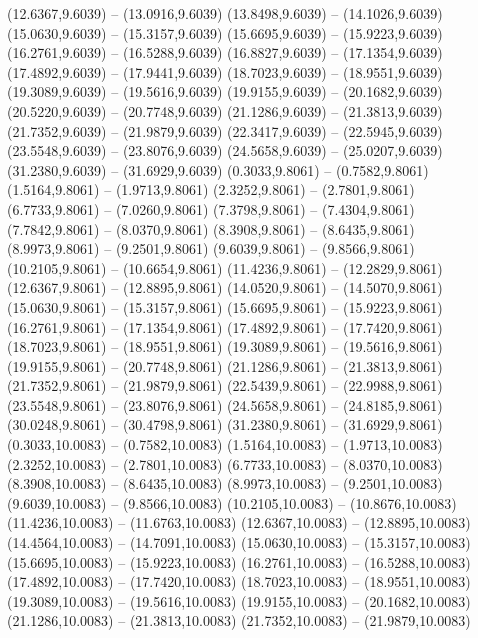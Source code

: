 {\begin{scope}[shift={(#1,#2)}]
    (12.6367,9.6039) -- (13.0916,9.6039)
    (13.8498,9.6039) -- (14.1026,9.6039)
    (15.0630,9.6039) -- (15.3157,9.6039)
    (15.6695,9.6039) -- (15.9223,9.6039)
    (16.2761,9.6039) -- (16.5288,9.6039)
    (16.8827,9.6039) -- (17.1354,9.6039)
    (17.4892,9.6039) -- (17.9441,9.6039)
    (18.7023,9.6039) -- (18.9551,9.6039)
    (19.3089,9.6039) -- (19.5616,9.6039)
    (19.9155,9.6039) -- (20.1682,9.6039)
    (20.5220,9.6039) -- (20.7748,9.6039)
    (21.1286,9.6039) -- (21.3813,9.6039)
    (21.7352,9.6039) -- (21.9879,9.6039)
    (22.3417,9.6039) -- (22.5945,9.6039)
    (23.5548,9.6039) -- (23.8076,9.6039)
    (24.5658,9.6039) -- (25.0207,9.6039)
    (31.2380,9.6039) -- (31.6929,9.6039)
    (0.3033,9.8061) -- (0.7582,9.8061)
    (1.5164,9.8061) -- (1.9713,9.8061)
    (2.3252,9.8061) -- (2.7801,9.8061)
    (6.7733,9.8061) -- (7.0260,9.8061)
    (7.3798,9.8061) -- (7.4304,9.8061)
    (7.7842,9.8061) -- (8.0370,9.8061)
    (8.3908,9.8061) -- (8.6435,9.8061)
    (8.9973,9.8061) -- (9.2501,9.8061)
    (9.6039,9.8061) -- (9.8566,9.8061)
    (10.2105,9.8061) -- (10.6654,9.8061)
    (11.4236,9.8061) -- (12.2829,9.8061)
    (12.6367,9.8061) -- (12.8895,9.8061)
    (14.0520,9.8061) -- (14.5070,9.8061)
    (15.0630,9.8061) -- (15.3157,9.8061)
    (15.6695,9.8061) -- (15.9223,9.8061)
    (16.2761,9.8061) -- (17.1354,9.8061)
    (17.4892,9.8061) -- (17.7420,9.8061)
    (18.7023,9.8061) -- (18.9551,9.8061)
    (19.3089,9.8061) -- (19.5616,9.8061)
    (19.9155,9.8061) -- (20.7748,9.8061)
    (21.1286,9.8061) -- (21.3813,9.8061)
    (21.7352,9.8061) -- (21.9879,9.8061)
    (22.5439,9.8061) -- (22.9988,9.8061)
    (23.5548,9.8061) -- (23.8076,9.8061)
    (24.5658,9.8061) -- (24.8185,9.8061)
    (30.0248,9.8061) -- (30.4798,9.8061)
    (31.2380,9.8061) -- (31.6929,9.8061)
    (0.3033,10.0083) -- (0.7582,10.0083)
    (1.5164,10.0083) -- (1.9713,10.0083)
    (2.3252,10.0083) -- (2.7801,10.0083)
    (6.7733,10.0083) -- (8.0370,10.0083)
    (8.3908,10.0083) -- (8.6435,10.0083)
    (8.9973,10.0083) -- (9.2501,10.0083)
    (9.6039,10.0083) -- (9.8566,10.0083)
    (10.2105,10.0083) -- (10.8676,10.0083)
    (11.4236,10.0083) -- (11.6763,10.0083)
    (12.6367,10.0083) -- (12.8895,10.0083)
    (14.4564,10.0083) -- (14.7091,10.0083)
    (15.0630,10.0083) -- (15.3157,10.0083)
    (15.6695,10.0083) -- (15.9223,10.0083)
    (16.2761,10.0083) -- (16.5288,10.0083)
    (17.4892,10.0083) -- (17.7420,10.0083)
    (18.7023,10.0083) -- (18.9551,10.0083)
    (19.3089,10.0083) -- (19.5616,10.0083)
    (19.9155,10.0083) -- (20.1682,10.0083)
    (21.1286,10.0083) -- (21.3813,10.0083)
    (21.7352,10.0083) -- (21.9879,10.0083)

\end{scope}}
